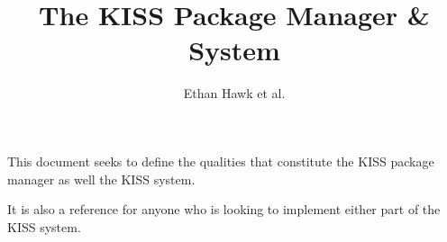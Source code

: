 \documentclass{article}
\title{The KISS Package Manager \& System}
\author{Ethan Hawk et al.}
\begin{document}
\maketitle
\tableofcontents

\newpage
This document seeks to define the qualities that constitute the
KISS package manager as well the KISS system.

It is also a reference for anyone who is looking to implement
either part of the KISS system.


\end{document}
